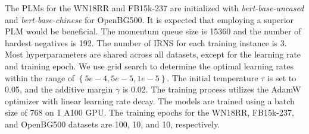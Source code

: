 \documentclass[11pt]{article}
\begin{document}
The PLMs for the WN18RR and FB15k-237 are initialized with \emph{bert-base-uncased} and \emph{bert-base-chinese} for OpenBG500. It is expected that employing a superior PLM would be beneficial. The momentum queue size is 15360 and the number of hardest negatives is 192. The number of IRNS for each training instance is 3. Most hyperparameters are shared across all datasets, except for the learning rate and training epoch. We use grid search to determine the optimal learning rates within the range of $\left\{5e-4, 5e-5, 1e-5\right\}$. The initial temperature $\tau$ is set to 0.05, and the additive margin $\gamma$ is 0.02. The training process utilizes the AdamW optimizer with linear learning rate decay. The models are trained using a batch size of 768 on 1 A100 GPU. The training epochs for the WN18RR, FB15k-237, and OpenBG500 datasets are 100, 10, and 10, respectively.
\begin{table}[ht]
\centering
{}
\vspace{-5pt}
\caption{Results on the OpenBG500 dataset.
$^\dagger$: results are from ~\citet{Deng2022ConstructionAA}.}
\label{tab:openbg}
\vspace{-10pt}
\end{table}
\end{document}
